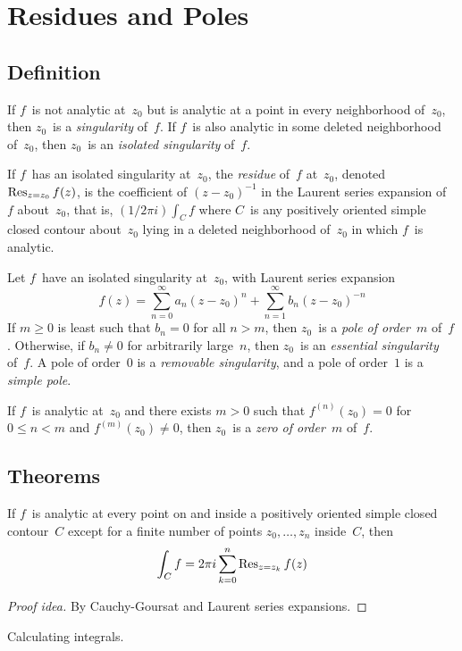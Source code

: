 %
%
%
\section{Residues and Poles}
\subsection*{Definition}
\begin{defn}
If \(f\)~is not analytic at~\(z_0\) but is analytic at a point in every neighborhood of~\(z_0\), then \(z_0\)~is a \emph{singularity} of~\(f\). If \(f\)~is also analytic in some deleted neighborhood of~\(z_0\), then \(z_0\)~is an \emph{isolated singularity} of~\(f\).
\end{defn}
\begin{defn}
If \(f\)~has an isolated singularity at~\(z_0\), the \emph{residue} of~\(f\) at~\(z_0\), denoted~\(\displaystyle\operatorname{Res}_{z=z_0}f(z)\), is the coefficient of \((z-z_0)^{-1}\) in the Laurent series expansion of~\(f\) about~\(z_0\), that is, \((1/2\pi i)\int_C f\) where \(C\)~is any positively oriented simple closed contour about~\(z_0\) lying in a deleted neighborhood of~\(z_0\) in which \(f\)~is analytic.
\end{defn}
\begin{defn}
Let \(f\)~have an isolated singularity at~\(z_0\), with Laurent series expansion
\[f(z)=\sum_{n=0}^\infty a_n(z-z_0)^n+\sum_{n=1}^\infty b_n(z-z_0)^{-n}\]
If \(m\ge0\) is least such that \(b_n=0\) for all \(n>m\), then \(z_0\)~is a \emph{pole of order~\(m\)} of~\(f\). Otherwise, if \(b_n\ne0\) for arbitrarily large~\(n\), then \(z_0\)~is an \emph{essential singularity} of~\(f\). A pole of order~\(0\) is a \emph{removable singularity}, and a pole of order~\(1\) is a \emph{simple pole}.
\end{defn}
\begin{defn}
If \(f\)~is analytic at~\(z_0\) and there exists \(m>0\) such that \(f^{(n)}(z_0)=0\) for \(0\le n<m\) and \(f^{(m)}(z_0)\ne0\), then \(z_0\)~is a \emph{zero of order~\(m\)} of~\(f\).
\end{defn}
\subsection*{Theorems}

\begin{thm}
If \(f\)~is analytic at every point on and inside a positively oriented simple closed contour~\(C\) except for a finite number of points \(z_0,\ldots,z_n\) inside~\(C\), then
\[\int_C f=2\pi i\sum_{k=0}^n\operatorname{Res}_{z=z_k}f(z)\]
\end{thm}
\begin{proof}[Proof idea]
By Cauchy-Goursat and Laurent series expansions.
\end{proof}
\begin{app}
Calculating integrals.
\end{app}

